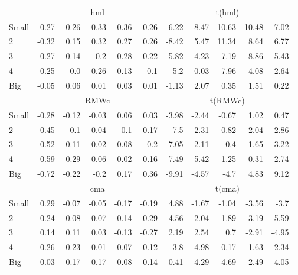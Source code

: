 \begin{table}[!ht]
\begin{tabular}{lrrrrrrrrrr}
  

      & \multicolumn{5}{c}{hml} & \multicolumn{5}{c}{t(hml)} \\
    \cmidrule(r){2-6} \cmidrule(r){7-11}
      Small  & -0.27  & 0.26  & 0.33  & 0.36  & 0.26   & -6.22  & 8.47  & 10.63  & 10.48  & 7.02  \\
          2  & -0.32  & 0.15  & 0.32  & 0.27  & 0.26   & -8.42  & 5.47  & 11.34  & 8.64  & 6.77  \\
          3  & -0.27  & 0.14  & 0.2  & 0.28  & 0.22   & -5.82  & 4.23  & 7.19  & 8.86  & 5.43  \\
          4  & -0.25  & 0.0  & 0.26  & 0.13  & 0.1   & -5.2  & 0.03  & 7.96  & 4.08  & 2.64  \\
      Big    & -0.05  & 0.06  & 0.01  & 0.03  & 0.01   & -1.13  & 2.07  & 0.35  & 1.51  & 0.22  \\

  

      & \multicolumn{5}{c}{RMWc} & \multicolumn{5}{c}{t(RMWc)} \\
    \cmidrule(r){2-6} \cmidrule(r){7-11}
      Small  & -0.28  & -0.12  & -0.03  & 0.06  & 0.03   & -3.98  & -2.44  & -0.67  & 1.02  & 0.47  \\
          2  & -0.45  & -0.1  & 0.04  & 0.1  & 0.17   & -7.5  & -2.31  & 0.82  & 2.04  & 2.86  \\
          3  & -0.52  & -0.11  & -0.02  & 0.08  & 0.2   & -7.05  & -2.11  & -0.4  & 1.65  & 3.22  \\
          4  & -0.59  & -0.29  & -0.06  & 0.02  & 0.16   & -7.49  & -5.42  & -1.25  & 0.31  & 2.74  \\
      Big    & -0.72  & -0.22  & -0.2  & 0.17  & 0.36   & -9.91  & -4.57  & -4.7  & 4.83  & 9.12  \\

  

      & \multicolumn{5}{c}{cma} & \multicolumn{5}{c}{t(cma)} \\
    \cmidrule(r){2-6} \cmidrule(r){7-11}
      Small  & 0.29  & -0.07  & -0.05  & -0.17  & -0.19   & 4.88  & -1.67  & -1.04  & -3.56  & -3.7  \\
          2  & 0.24  & 0.08  & -0.07  & -0.14  & -0.29   & 4.56  & 2.04  & -1.89  & -3.19  & -5.59  \\
          3  & 0.14  & 0.11  & 0.03  & -0.13  & -0.27   & 2.19  & 2.54  & 0.7  & -2.91  & -4.95  \\
          4  & 0.26  & 0.23  & 0.01  & 0.07  & -0.12   & 3.8  & 4.98  & 0.17  & 1.63  & -2.34  \\
      Big    & 0.03  & 0.17  & 0.17  & -0.08  & -0.14   & 0.41  & 4.29  & 4.69  & -2.49  & -4.05  \\

  

  \bottomrule
\end{tabular}
\label{tbl:25_Size_OP_FF2016b}
\end{table}